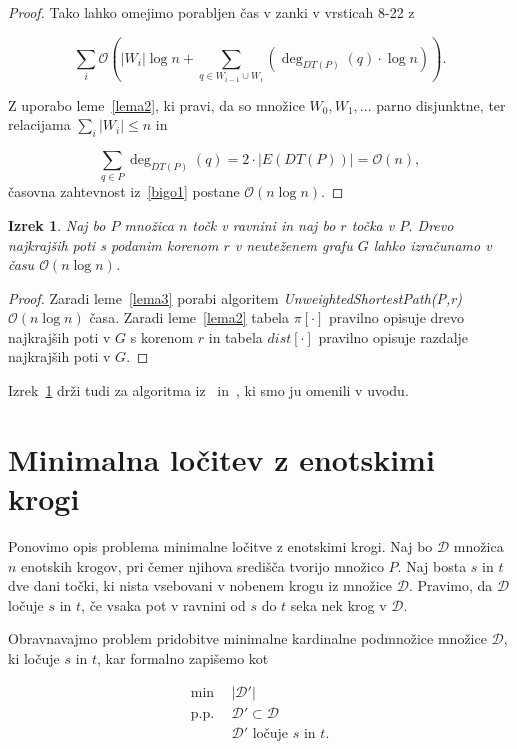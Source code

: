 \documentclass[a4paper, 12pt]{book}
\newcommand{\D}{\ensuremath{\mathcal{D}}}
\newcommand{\OO}{\ensuremath{\mathcal{O}}} %
\newtheorem{izrek}{Izrek}[chapter]
\begin{document}
\begin{proof}
Tako lahko omejimo porabljen čas v zanki v vrsticah 8-22 z

\begin{equation}
\label{bigo1}
\sum_i \OO \left( |W_i|\log n + \sum_{q\in W_{i-1}\cup W_i} (\deg_{DT(P)}(q) \cdot \log n) \right) .
\end{equation}

Z uporabo leme~\ref{lema2}, ki pravi, da so množice $W_0,W_1,...$ parno disjunktne, ter relacijama $\sum_i |W_i| \leq n$ in 

\begin{equation*}
\sum_{q \in P} \deg_{DT(P)}(q) = 2 \cdot |E(DT(P))| = \OO(n),
\end{equation*}
časovna zahtevnost iz~\ref{bigo1} postane $\OO(n\log n)$.
\end{proof}

\begin{izrek}
\label{ssspIzrek}
Naj bo $P$ množica $n$ točk v ravnini in naj bo $r$ točka v $P$. Drevo najkrajših poti s podanim korenom $r$ v neuteženem grafu $G$ lahko izračunamo v času $\OO(n\log n)$.
\end{izrek}

\begin{proof}
Zaradi leme~\ref{lema3} porabi algoritem \textit{UnweightedShortestPath(P,r)} $\OO(n\log n)$ časa. Zaradi leme~\ref{lema2} tabela $\pi[\cdot]$ pravilno opisuje drevo najkrajših poti v $G$ s korenom $r$ in tabela $dist[\cdot]$ pravilno opisuje razdalje najkrajših poti v $G$.
\end{proof}
\afterpage{\FloatBarrier}

Izrek~\ref{ssspIzrek} drži tudi za algoritma iz~\cite{eik-01} in~\cite{ChanS16}, ki smo ju omenili v uvodu.

\section{Minimalna ločitev z enotskimi krogi}
Ponovimo opis problema minimalne ločitve z enotskimi krogi.
Naj bo $\D$ množica $n$ enotskih krogov, pri čemer njihova središča tvorijo množico $P$. Naj bosta $s$ in $t$ dve dani točki, ki nista vsebovani v nobenem krogu iz množice $\D$. Pravimo, da $\D$ ločuje $s$ in $t$, če vsaka pot v ravnini od $s$ do $t$ seka nek krog v $\D$.

Obravnavajmo problem pridobitve minimalne kardinalne podmnožice mno\-ži\-ce $\D$, ki ločuje $s$ in $t$, kar formalno zapišemo kot 

\begin{align*}
	\min ~~		& |\D'|\\
	 \mbox{p.p.}~~ & \D'\subset \D\\
				&	\D'\text{ ločuje $s$ in $t$}. 
\end{align*}
\end{document}
